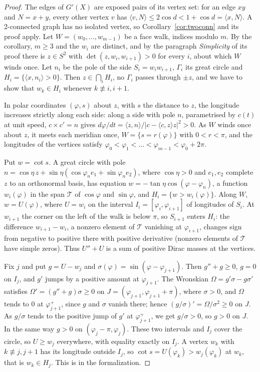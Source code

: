 \documentclass[12pt]{amsart}
\theoremstyle{definition}
\theoremstyle{plain}
\theoremstyle{definition}
\newcommand{\Sph}{S^2}
\begin{document}
\begin{proof}
The edges of $G'(X)$ are exposed pairs of its vertex set: for an edge $xy$ and $N=x+y$, every other vertex $v$ has $\langle v,N\rangle\le2\cos d<1+\cos d=\langle x,N\rangle$. A 2-connected graph has no isolated vertex, so Corollary~\ref{cor:twoconn} and its proof apply. Let $W=(w_0,\dots,w_{m-1})$ be a face walk, indices modulo $m$. By the corollary, $m\ge3$ and the $w_i$ are distinct, and by the paragraph \emph{Simplicity} of its proof there is $z\in\Sph$ with $\det(z,w_i,w_{i+1})>0$ for every $i$, about which $W$ winds once. Let $n_i$ be the pole of the side $S_i=w_iw_{i+1}$, $\Gamma_i$ its great circle and $H_i=\{\langle x,n_i\rangle>0\}$. Then $z\in\bigcap_iH_i$, no $\Gamma_i$ passes through $\pm z$, and we have to show that $w_k\in H_i$ whenever $k\not\equiv i,i+1$.

In polar coordinates $(\varphi,s)$ about $z$, with $s$ the distance to $z$, the longitude increases strictly along each side: along a side with pole $n$, parametrised by $c(t)$ at unit speed, $c\times c'=n$ gives $d\varphi/dt=\langle z,n\rangle/|c-\langle c,z\rangle z|^2>0$. As $W$ winds once about $z$, it meets each meridian once, $W=\{s=r(\varphi)\}$ with $0<r<\pi$, and the longitudes of the vertices satisfy $\varphi_0<\varphi_1<\dots<\varphi_{m-1}<\varphi_0+2\pi$.

Put $w=\cot s$. A great circle with pole $n=\cos\eta\,z+\sin\eta(\cos\varphi_n e_1+\sin\varphi_n e_2)$, where $\cos\eta>0$ and $e_1,e_2$ complete $z$ to an orthonormal basis, has equation $w=-\tan\eta\cos(\varphi-\varphi_n)$, a function $w_i(\varphi)$ in the span $\mathcal T$ of $\cos\varphi$ and $\sin\varphi$, and $H_i=\{w>w_i(\varphi)\}$. Along $W$, $w=U(\varphi)$, where $U=w_i$ on the interval $I_i=[\varphi_i,\varphi_{i+1}]$ of longitudes of $S_i$. At $w_{i+1}$ the corner on the left of the walk is below $\pi$, so $S_{i+1}$ enters $H_i$: the difference $w_{i+1}-w_i$, a nonzero element of $\mathcal T$ vanishing at $\varphi_{i+1}$, changes sign from negative to positive there with positive derivative (nonzero elements of $\mathcal T$ have simple zeros). Thus $U''+U$ is a sum of positive Dirac masses at the vertices.

Fix $j$ and put $g=U-w_j$ and $\sigma(\varphi)=\sin(\varphi-\varphi_{j+1})$. Then $g''+g\ge0$, $g=0$ on $I_j$, and $g'$ jumps by a positive amount at $\varphi_{j+1}$. The Wronskian $\Omega=g'\sigma-g\sigma'$ satisfies $\Omega'=(g''+g)\sigma\ge0$ on $J=(\varphi_{j+1},\varphi_{j+1}+\pi)$, where $\sigma>0$, and $\Omega$ tends to $0$ at $\varphi_{j+1}^+$, since $g$ and $\sigma$ vanish there; hence $(g/\sigma)'=\Omega/\sigma^2\ge0$ on $J$. As $g/\sigma$ tends to the positive jump of $g'$ at $\varphi_{j+1}^+$, we get $g/\sigma>0$, so $g>0$ on $J$. In the same way $g>0$ on $(\varphi_j-\pi,\varphi_j)$. These two intervals and $I_j$ cover the circle, so $U\ge w_j$ everywhere, with equality exactly on $I_j$. A vertex $w_k$ with $k\not\equiv j,j+1$ has its longitude outside $I_j$, so $\cot s=U(\varphi_k)>w_j(\varphi_k)$ at $w_k$, that is $w_k\in H_j$. This is  in the formalization.
\end{proof}
\end{document}
